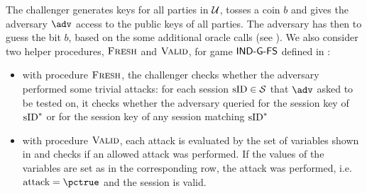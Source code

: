 The challenger generates keys for all parties in $\mathcal{U}$, tosses a coin $b$ and gives the adversary $\adv$ access to the public keys of all parties.
The adversary has then to guess the bit $b$, based on the some additional oracle calls (see ).
We also consider two helper procedures, $\textsc{Fresh}$ and $\textsc{Valid}$, for game $\mathsf{IND\mbox{-} G\mbox{-} FS}$ defined in :
\begin{itemize}
	\item with procedure $\textsc{Fresh}$, the challenger checks whether the adversary performed some trivial attacks: for each session $\text{sID}\in \mathcal{S}$ that $\adv$ asked to be tested on, it checks whether the adversary queried for the session key of $\text{sID}^*$ or for the session key of any session matching $\text{sID}^*$
	\item with procedure $\textsc{Valid}$, each attack is evaluated by the set of variables shown in  and checks if an allowed attack was performed. 
	If the values of the variables are set as in the corresponding row, the attack was performed, i.e. $\attack=\pctrue$ and the session is valid.
\end{itemize}


